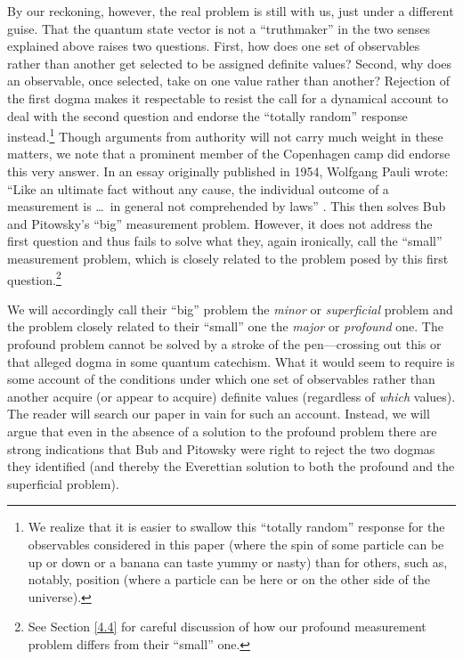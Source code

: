 By our reckoning, however, the real problem is still with us, just under a different guise. That the quantum state vector is not a ``truthmaker'' in the two senses explained above raises two questions. First, how does one set of observables rather than another get selected to be assigned definite values? Second, why does an observable, once selected, take on one value rather than another? Rejection of the first dogma makes it respectable to resist the call for a dynamical account to deal with the second question and endorse the ``totally random'' response instead.\footnote{We realize that it is easier to swallow this ``totally random'' response for the observables considered in this paper (where the spin of some particle can be up or down or a banana can taste yummy or nasty) than for others, such as, notably, position (where a particle can be here or on the other side of the universe).}
Though arguments from authority will not carry much weight in these matters, we note that a prominent member of the Copenhagen camp did endorse this very answer. In an essay originally published in 1954, Wolfgang Pauli wrote: ``Like an ultimate fact without any cause, the individual outcome of a measurement is \ldots\  in general not comprehended by laws'' \citep[p.\ 32, quoted by Gilder, 2008, p.\ 169]{Pauli 1994}. This then solves Bub and Pitowsky's ``big'' measurement problem. However, it does not address the first question and thus fails to solve what they, again ironically, call the ``small'' measurement problem, which is closely related to the problem posed by this first question.\footnote{See Section \ref{4.4} for careful discussion of how our profound measurement problem differs from their ``small'' one.}

We will accordingly call  their ``big'' problem the \emph{minor} or \emph{superficial} problem and the problem closely related to their ``small'' one the \emph{major} or \emph{profound} one. The profound problem cannot be solved by a stroke of the pen---crossing out this or that alleged dogma in some quantum catechism. What it would seem to require is some account of the conditions under which one set of observables rather than another acquire (or appear to acquire) definite values (regardless of \emph{which} values). The reader will search our paper in vain for such an account. Instead, we will argue that even in the absence of a solution to the profound problem there are strong indications that Bub and Pitowsky were right to reject the two dogmas they identified (and thereby the Everettian solution to both the profound and the superficial problem).

